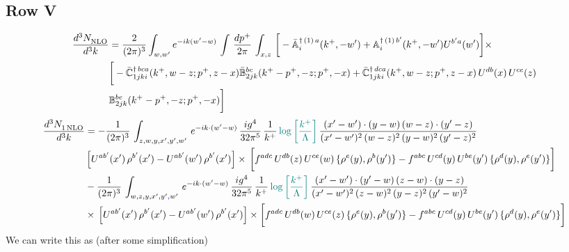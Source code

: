 \documentclass[9pt]{article}
\def\mf#1{\mathbb{#1}}
\numberwithin{equation}{section}
\begin{document}
\subsection{Row V}
\begin{align}
    \frac{d^{3}N_{\rm NLO}^{\rm}}{d^{3}k}  & = \frac{2}{(2\pi)^{3}}  \int_{w, w^\prime} e^{-ik(w^\prime-w)}\, \int\, \frac{dp^{+}}{2\pi}\,\int_{x,z}\, \bigg[-\bar{\mf{A}}^{\dagger\,(1)\,a}_{i}(k^{+},-w^{\prime})+\mf{A}^{\dagger\, (1)\, b^{\prime}}_{i}(k^{+},-w^{\prime})U^{b^{\prime}a}(w^{\prime})\bigg]\times\notag \\ & \bigg[-\Bar{\mf{C}}^{\dagger\, bca}_{1jki}(k^{+},w-z;p^{+},z-x)\Bar{\mf{B}}^{bc}_{2jk}(k^{+}-p^{+},- z;p^{+},-x)+\bar{\mf{C}}^{\dagger\, dca}_{1jki}(k^+,w-z; p^+, z-x)\,U^{db}(x)\,U^{ce}(z) \notag \\ & {\mf{B}}^{be}_{2jk} (k^{+}-p^+, -z; p^+, -x) \bigg]\nonumber
\end{align}
\begin{align}
     \frac{d^{3}N_{1\,\rm NLO}^{\rm}}{d^{3}k}  & =  -\frac{1}{(2\pi)^{3}}\, \int_{z,w,y,x',y',w'}\,e^{-ik\cdot (w^\prime-w)}\,\frac{ig^{4}}{32\pi^{5}}\, \frac{1}{k^{+}}\,{\color{teal}\log{\left[\frac{k^{+}}{\Lambda}\right]}}\,\frac{(x'-w')\cdot (y-w)\,(w-z)\cdot (y'-z)}{(x'-w')^{2}\,(w-z)^{2}\,(y-w)^{2}\,(y'-z)^{2}}\,\notag \\ & \left[U^{ab'}(x')\,\rho^{b'}(x')-U^{ab'}(w')\,\rho^{b'}(x')\right]\times\, \bigg[f^{adc}\,U^{db}(z)\,U^{ce}(w)\, \{\rho^{e}(y),\rho^{b}(y')\}-f^{abc}\,U^{cd}(y)\,U^{be}(y')\, \{\rho^{d}(y),\rho^{e}(y')\}\bigg]\notag \\ &  -\frac{1}{(2\pi)^{3}}\, \int_{w,z,y,x',y'{\color{blue},}w'}\,e^{-ik\cdot (w^\prime-w)}\,\frac{ig^{4}}{32\pi^{5}}\, \frac{1}{k^{+}}\,{\color{teal}\log{\left[\frac{k^{+}}{\Lambda}\right]}}\,\frac{(x'-w')\cdot (y'-w)\,(z-w)\cdot (y-z)}{(x'-w')^{2}\,(z-w)^{2}\,(y-z)^{2}\,(y'-w)^{2}}\notag \\ & \times\, \left[U^{ab'}(x')\,\rho^{b'}(x')-U^{ab'}(w')\,\rho^{b'}(x')\right]\times \bigg[f^{adc}\,U^{db}(w)\,U^{ce}(z)\, \{\rho^{e}(y),\rho^{b}(y')\}-f^{abc}\,U^{cd}(y)\,U^{be}(y')\, \{\rho^{d}(y),\rho^{e}(y')\}\bigg]
\end{align}
We can write this as (after some simplification)
\end{document}
